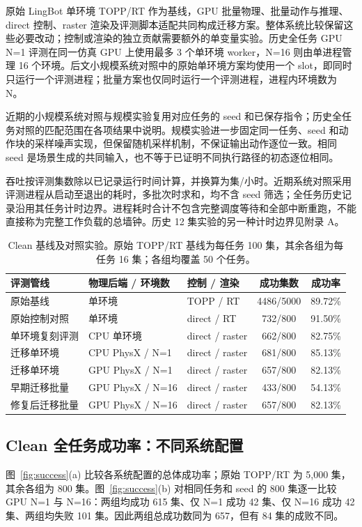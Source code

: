 \documentclass{article}
\begin{document}
原始 LingBot 单环境 TOPP/RT 作为基线，GPU 批量物理、批量动作与推理、direct 控制、raster 渲染及评测脚本适配共同构成迁移方案。整体系统比较保留这些必要改动；控制或渲染的独立贡献需要额外的单变量实验。历史全任务 GPU N=1 评测在同一仿真 GPU 上使用最多 3 个单环境 worker，N=16 则由单进程管理 16 个环境。后文小规模系统对照中的原始单环境方案均使用一个 slot，即同时只运行一个评测进程；批量方案也仅同时运行一个评测进程，进程内环境数为 N。

近期的小规模系统对照与规模实验复用对应任务的 seed 和已保存指令；历史全任务对照的匹配范围在各项结果中说明。规模实验进一步固定同一任务、seed 和动作块的采样噪声实现，但保留随机采样机制，不保证输出动作逐位一致。相同 seed 是场景生成的共同输入，也不等于已证明不同执行路径的初态逐位相同。

吞吐按评测集数除以已记录运行时间计算，并换算为集/小时。近期系统对照采用评测进程从启动至退出的耗时，多批次时求和，均不含 seed 筛选；全任务历史记录沿用其任务计时边界。进程耗时合计不包含完整调度等待和全部中断重跑，不能直接称为完整工作负载的总墙钟。历史 12 集实验的另一种计时边界见附录 A。

\begin{table}[htbp]
\centering\small
\caption{Clean 基线及对照实验。原始 TOPP/RT 基线为每任务 100 集，其余各组为每任务 16 集；各组均覆盖 50 个任务。}
\label{tab:protocol}
\begin{tabularx}{\textwidth}{@{}lYYcc@{}}
\toprule
评测管线 & 物理后端 / 环境数 & 控制 / 渲染 & 成功集数 & 成功率 \\
\midrule
原始基线 & 单环境 & TOPP / RT & 4486/5000 & 89.72\% \\
原始控制对照 & 单环境 & direct / RT & 732/800 & 91.50\% \\
单环境复刻评测 & CPU 单环境 & direct / raster & 662/800 & 82.75\% \\
迁移单环境 & CPU PhysX / N=1 & direct / raster & 681/800 & 85.13\% \\
迁移单环境 & GPU PhysX / N=1 & direct / raster & 657/800 & 82.13\% \\
早期迁移批量 & GPU PhysX / N=16 & direct / raster & 433/800 & 54.13\% \\
修复后迁移批量 & GPU PhysX / N=16 & direct / raster & 657/800 & 82.13\% \\
\bottomrule
\end{tabularx}
\end{table}

\subsection{Clean 全任务成功率：不同系统配置}
图~\ref{fig:success}(a) 比较各系统配置的总体成功率；原始 TOPP/RT 为 5,000 集，其余各组为 800 集。图~\ref{fig:success}(b) 对相同任务和 seed 的 800 集逐一比较 GPU N=1 与 N=16：两组均成功 615 集、仅 N=1 成功 42 集、仅 N=16 成功 42 集、两组均失败 101 集。因此两组总成功数同为 657，但有 84 集的成败不同。
\end{document}

